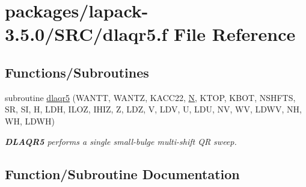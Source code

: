 \hypertarget{dlaqr5_8f}{}\section{packages/lapack-\/3.5.0/\+S\+R\+C/dlaqr5.f File Reference}
\label{dlaqr5_8f}
\subsection*{Functions/\+Subroutines}
\begin{DoxyCompactItemize}
\item 
subroutine \hyperlink{dlaqr5_8f_a305adfeca0e3bed5530e96cac624434c}{dlaqr5} (W\+A\+N\+T\+T, W\+A\+N\+T\+Z, K\+A\+C\+C22, \hyperlink{polmisc_8c_a0240ac851181b84ac374872dc5434ee4}{N}, K\+T\+O\+P, K\+B\+O\+T, N\+S\+H\+F\+T\+S, S\+R, S\+I, H, L\+D\+H, I\+L\+O\+Z, I\+H\+I\+Z, Z, L\+D\+Z, V, L\+D\+V, U, L\+D\+U, N\+V, W\+V, L\+D\+W\+V, N\+H, W\+H, L\+D\+W\+H)
\begin{DoxyCompactList}\small\item\em {\bfseries D\+L\+A\+Q\+R5} performs a single small-\/bulge multi-\/shift Q\+R sweep. \end{DoxyCompactList}\end{DoxyCompactItemize}


\subsection{Function/\+Subroutine Documentation}
\hypertarget{dlaqr5_8f_a305adfeca0e3bed5530e96cac624434c}{}
